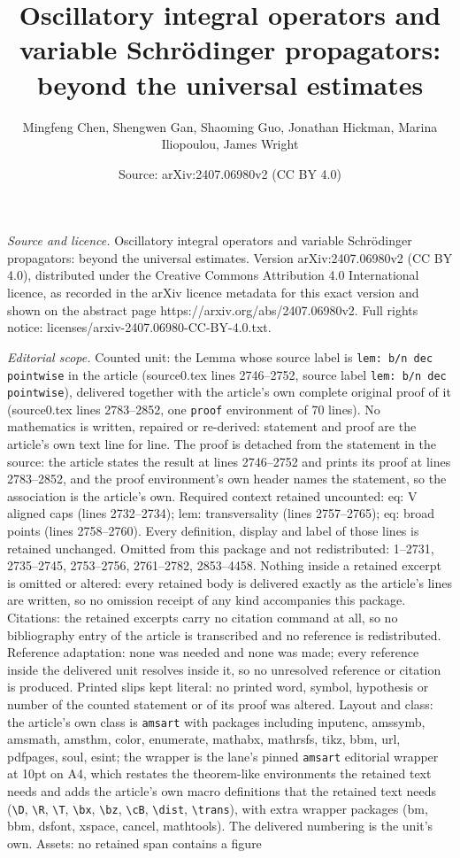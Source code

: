 \documentclass[10pt,a4paper]{amsart}
\title[Oscillatory integral operators and variable Schr\"odinger pr]{Oscillatory integral operators and variable Schr\"odinger propagators: beyond the universal estimates}
\author{Mingfeng Chen, Shengwen Gan, Shaoming Guo, Jonathan Hickman, Marina Iliopoulou, James Wright}
\date{Source: arXiv:2407.06980v2 (CC BY 4.0)}
\begin{document}
\maketitle

\noindent\emph{Source and licence.} Oscillatory integral operators and variable Schr\"odinger propagators: beyond the universal estimates. Version arXiv:2407.06980v2 (CC BY 4.0), distributed under the Creative Commons Attribution 4.0 International licence, as recorded in the arXiv licence metadata for this exact version and shown on the abstract page https://arxiv.org/abs/2407.06980v2. Full rights notice: licenses/arxiv-2407.06980-CC-BY-4.0.txt.\par\smallskip

\noindent\textit{Editorial scope.} Counted unit: the Lemma whose source label is \texttt{lem: b/n dec pointwise} in the article (source0.tex lines 2746--2752, source label \texttt{lem: b/n dec pointwise}), delivered together with the article's own complete original proof of it (source0.tex lines 2783--2852, one \texttt{proof} environment of 70 lines). No mathematics is written, repaired or re-derived: statement and proof are the article's own text line for line. The proof is detached from the statement in the source: the article states the result at lines 2746--2752 and prints its proof at lines 2783--2852, and the proof environment's own header names the statement, so the association is the article's own. Required context retained uncounted: eq: V aligned caps (lines 2732--2734); lem: transversality (lines 2757--2765); eq: broad points (lines 2758--2760). Every definition, display and label of those lines is retained unchanged. Omitted from this package and not redistributed: 1--2731, 2735--2745, 2753--2756, 2761--2782, 2853--4458. Nothing inside a retained excerpt is omitted or altered: every retained body is delivered exactly as the article's lines are written, so no omission receipt of any kind accompanies this package. Citations: the retained excerpts carry no citation command at all, so no bibliography entry of the article is transcribed and no reference is redistributed. Reference adaptation: none was needed and none was made; every reference inside the delivered unit resolves inside it, so no unresolved reference or citation is produced. Printed slips kept literal: no printed word, symbol, hypothesis or number of the counted statement or of its proof was altered. Layout and class: the article's own class is \texttt{amsart} with packages including inputenc, amssymb, amsmath, amsthm, color, enumerate, mathabx, mathrsfs, tikz, bbm, url, pdfpages, soul, esint; the wrapper is the lane's pinned \texttt{amsart} editorial wrapper at 10pt on A4, which restates the theorem-like environments the retained text needs and adds the article's own macro definitions that the retained text needs (\texttt{\textbackslash D}, \texttt{\textbackslash R}, \texttt{\textbackslash T}, \texttt{\textbackslash bx}, \texttt{\textbackslash bz}, \texttt{\textbackslash cB}, \texttt{\textbackslash dist}, \texttt{\textbackslash trans}), with extra wrapper packages (bm, bbm, dsfont, xspace, cancel, mathtools). The delivered numbering is the unit's own. Assets: no retained span contains a figure 
\end{document}
